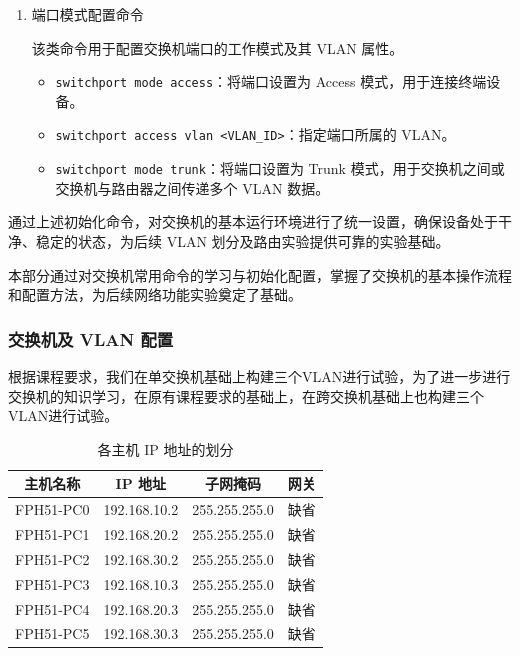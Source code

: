 \documentclass[UTF8,12pt,a4paper]{ctexart}
\begin{document}
\begin{enumerate}[label=（\arabic*）, leftmargin=2em, itemsep=1em]
  \item {\heiti 端口模式配置命令}

  该类命令用于配置交换机端口的工作模式及其 VLAN 属性。

  \begin{itemize}
    \item \texttt{switchport mode access}：将端口设置为 Access 模式，用于连接终端设备。
    \item \texttt{switchport access vlan <VLAN\_ID>}：指定端口所属的 VLAN。
    \item \texttt{switchport mode trunk}：将端口设置为 Trunk 模式，用于交换机之间或交换机与路由器之间传递多个 VLAN 数据。
  \end{itemize}

\end{enumerate}

通过上述初始化命令，对交换机的基本运行环境进行了统一设置，确保设备处于干净、稳定的状态，为后续 VLAN 划分及路由实验提供可靠的实验基础。

本部分通过对交换机常用命令的学习与初始化配置，掌握了交换机的基本操作流程和配置方法，为后续网络功能实验奠定了基础。

\subsubsection{交换机及 VLAN 配置}


根据课程要求，我们在单交换机基础上构建三个VLAN进行试验，为了进一步进行交换机的知识学习，在原有课程要求的基础上，在跨交换机基础上也构建三个VLAN进行试验。

\begin{table}[H]
  \centering
  \caption{各主机 IP 地址的划分}
  \label{tab:host_ip}
  \begin{tabular}{cccc}
    \hline
    主机名称 & IP 地址 & 子网掩码 & 网关 \\ 
    \hline
    FPH51-PC0 & 192.168.10.2 & 255.255.255.0 & 缺省 \\ 
    FPH51-PC1 & 192.168.20.2 & 255.255.255.0 & 缺省 \\ 
    FPH51-PC2 & 192.168.30.2 & 255.255.255.0 & 缺省 \\ 
    FPH51-PC3 & 192.168.10.3 & 255.255.255.0 & 缺省 \\ 
    FPH51-PC4 & 192.168.20.3 & 255.255.255.0 & 缺省 \\ 
    FPH51-PC5 & 192.168.30.3 & 255.255.255.0 & 缺省 \\ 
    \hline
  \end{tabular}
\end{table}
\end{document}
